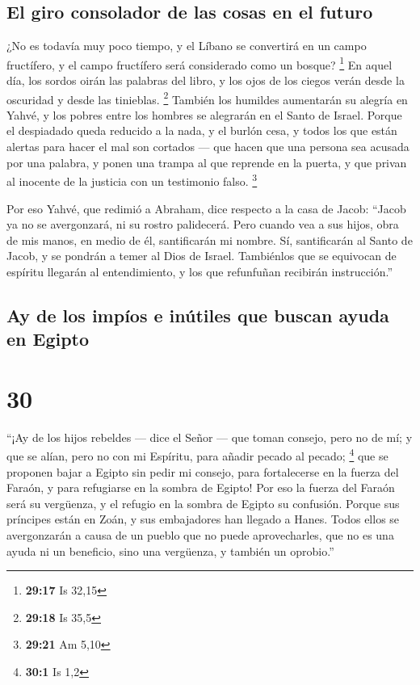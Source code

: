 \hypertarget{el-giro-consolador-de-las-cosas-en-el-futuro}{%
\subsection{El giro consolador de las cosas en el
futuro}\label{el-giro-consolador-de-las-cosas-en-el-futuro}}

 ¿No es todavía muy poco tiempo, y el Líbano se
convertirá en un campo fructífero, y el campo fructífero será
considerado como un bosque? \footnote{\textbf{29:17} Is 32,15}
 En aquel día, los sordos oirán las palabras del libro, y
los ojos de los ciegos verán desde la oscuridad y desde las tinieblas.
\footnote{\textbf{29:18} Is 35,5}  También los humildes
aumentarán su alegría en Yahvé, y los pobres entre los hombres se
alegrarán en el Santo de Israel.  Porque el despiadado
queda reducido a la nada, y el burlón cesa, y todos los que están
alertas para hacer el mal son cortados ---  que hacen que
una persona sea acusada por una palabra, y ponen una trampa al que
reprende en la puerta, y que privan al inocente de la justicia con un
testimonio falso. \footnote{\textbf{29:21} Am 5,10}

 Por eso Yahvé, que redimió a Abraham, dice respecto a la
casa de Jacob: ``Jacob ya no se avergonzará, ni su rostro palidecerá.
 Pero cuando vea a sus hijos, obra de mis manos, en medio
de él, santificarán mi nombre. Sí, santificarán al Santo de Jacob, y se
pondrán a temer al Dios de Israel.  Tambiénlos que se
equivocan de espíritu llegarán al entendimiento, y los que refunfuñan
recibirán instrucción.''

\hypertarget{ay-de-los-impuxedos-e-inuxfatiles-que-buscan-ayuda-en-egipto}{%
\subsection{Ay de los impíos e inútiles que buscan ayuda en
Egipto}\label{ay-de-los-impuxedos-e-inuxfatiles-que-buscan-ayuda-en-egipto}}

\hypertarget{section-29}{%
\section{30}\label{section-29}}

 ``¡Ay de los hijos rebeldes --- dice el Señor --- que
toman consejo, pero no de mí; y que se alían, pero no con mi Espíritu,
para añadir pecado al pecado; \footnote{\textbf{30:1} Is 1,2}
 que se proponen bajar a Egipto sin pedir mi consejo, para
fortalecerse en la fuerza del Faraón, y para refugiarse en la sombra de
Egipto!  Por eso la fuerza del Faraón será su vergüenza, y
el refugio en la sombra de Egipto su confusión.  Porque
sus príncipes están en Zoán, y sus embajadores han llegado a Hanes.
 Todos ellos se avergonzarán a causa de un pueblo que no
puede aprovecharles, que no es una ayuda ni un beneficio, sino una
vergüenza, y también un oprobio.''

